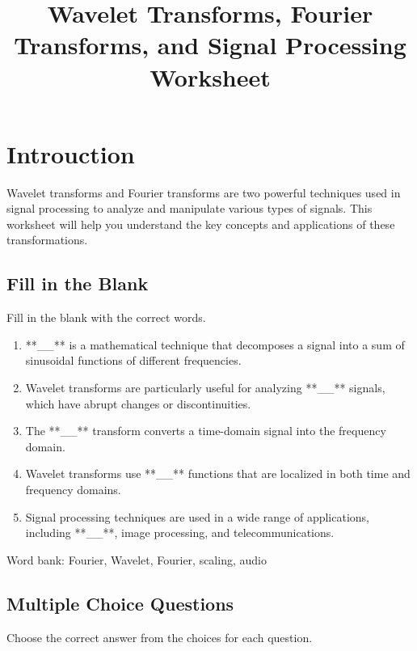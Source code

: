 \documentclass[
  letterpaper,
  DIV=11,
  numbers=noendperiod]{scrartcl}
\title{Wavelet Transforms, Fourier Transforms, and Signal Processing
Worksheet}
\author{}
\date{}
\makeatletter
\providecommand{\tightlist}{%
  \setlength{\itemsep}{0pt}\setlength{\parskip}{0pt}}\usepackage{longtable,booktabs,array}
\renewcommand{\maketitle}{\bgroup\setlength{\parindent}{0pt}
\begin{flushleft}
  {\sffamily\huge\textbf{\MakeUppercase{\@title}}} \vspace{0.3cm} \newline
  {\Large {\@subtitle}} \newline
  \@author
\end{flushleft}\egroup
}
\makeatother
\begin{document}
\maketitle

\pagestyle{mystyle}

\section{Introuction}\label{introuction}

Wavelet transforms and Fourier transforms are two powerful techniques
used in signal processing to analyze and manipulate various types of
signals. This worksheet will help you understand the key concepts and
applications of these transformations.

\subsection{Fill in the Blank}\label{fill-in-the-blank}

Fill in the blank with the correct words.

\begin{enumerate}
\def\labelenumi{\arabic{enumi}.}
\tightlist
\item
  **\_\_** is a mathematical technique that decomposes a signal into a
  sum of sinusoidal functions of different frequencies.
\item
  Wavelet transforms are particularly useful for analyzing **\_\_**
  signals, which have abrupt changes or discontinuities.
\item
  The **\_\_** transform converts a time-domain signal into the
  frequency domain.
\item
  Wavelet transforms use **\_\_** functions that are localized in both
  time and frequency domains.
\item
  Signal processing techniques are used in a wide range of applications,
  including **\_\_**, image processing, and telecommunications.
\end{enumerate}

Word bank: Fourier, Wavelet, Fourier, scaling, audio

\subsection{Multiple Choice Questions}\label{multiple-choice-questions}

Choose the correct answer from the choices for each question.
\end{document}
